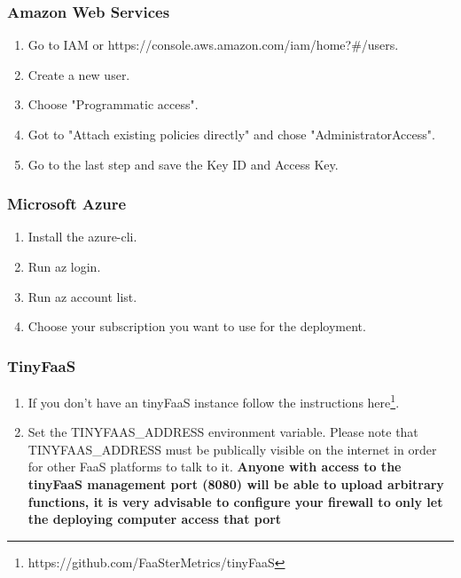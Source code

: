 \documentclass[../main.tex]{subfiles}
\begin{document}
\subsubsection{Amazon Web Services}\label{sec:providersetupaws}
\begin{enumerate}
\item Go to IAM or https://console.aws.amazon.com/iam/home?\#/users.
\item Create a new user.
\item Choose "Programmatic access".
\item Got to "Attach existing policies directly" and chose "AdministratorAccess".
\item Go to the last step and save the Key ID and Access Key.
\end{enumerate}

\subsubsection{Microsoft Azure}\label{sec:providersetupazure}
\begin{enumerate}
\item Install the azure-cli.
\item Run az login.
\item Run az account list.
\item Choose your subscription you want to use for the deployment.
\end{enumerate}

\subsubsection{TinyFaaS}\label{sec:providersetuptinyfaas}

\begin{enumerate}
\item If you don't have an tinyFaaS instance follow the instructions here\footnote{https://github.com/FaaSterMetrics/tinyFaaS}.
\item Set the TINYFAAS\_ADDRESS environment variable. Please note that TINYFAAS\_ADDRESS must be publically visible on the internet in order for other FaaS platforms to talk to it. \textbf{Anyone with access to the tinyFaaS management port (8080) will be able to upload arbitrary functions, it is very advisable to configure your firewall to only let the deploying computer access that port}

\end{enumerate}
\end{document}
